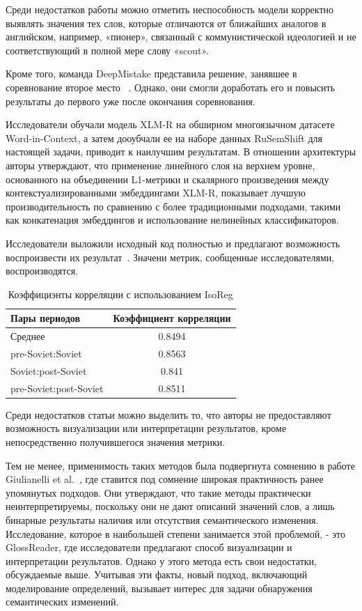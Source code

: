 \documentclass[LI,VKR]{HSEUniversity}
\begin{document}
Среди недостатков работы можно отметить неспособность модели корректно выявлять
значения тех слов, которые отличаются от ближайших аналогов в английском, например,
«пионер», связанный с коммунистической идеологией и не соответствующий в полной мере
слову «scout».

Кроме того, команда DeepMistake представила решение, занявшее в соревнование второе место
~\cite{DeepMistake}.
Однако, они смогли доработать его и повысить результаты до первого уже после окончания
соревнования.

Исследователи обучали модель XLM-R на обширном многоязычном датасете Word-in-Context,
а затем дооубчали ее на наборе данных RuSemShift для настоящей задачи,
приводит к наилучшим результатам.
В отношении архитектуры авторы утверждают, что применение линейного слоя на верхнем уровне,
основанного на объединении L1-метрики и скалярного произведения между контекстуализированными
эмбеддингами XLM-R, показывает лучшую производительность по сравнению с
более традиционными подходами, такими как конкатенация эмбеддингов и
использование нелинейных классификаторов.

Исследователи выложили исходный код полностью и предлагают возможность воспроизвести их
результат~\cite{DeepMistakeGitHub}.
Значени метрик, сообщенные исследователями, воспроизводятся.

\begin{table}[H]
\centering
\caption{Коэффициэнты корреляции с использованием IsoReg}
\begin{tabular}{lc}
\hline
Пары периодов                  & Коэффициент корреляции \\
\hline
Среднее            & 0.8494                  \\
pre-Soviet:Soviet           & 0.8563                  \\
Soviet:post-Soviet          & 0.841                  \\
pre-Soviet:post-Soviet      & 0.8511                  \\
\hline
\end{tabular}
\end{table}

Среди недостатков статьи можно выделить то, что авторы не предоставляют возможность визуализации
или интерпретации результатов, кроме непосредственно получившегося значения метрики.

Тем не менее, применимость таких методов была подвергнута сомнению в работе
Giulianelli et al.~\cite{DefinitionGenerationMainArticle},
где ставится под сомнение широкая практичность ранее упомянутых подходов.
Они утверждают, что такие методы практически неинтерпретируемы,
поскольку они не дают описаний значений слов,
а лишь бинарные результаты наличия или отсутствия семантического изменения.
Исследование, которое в наибольшей степени занимается этой проблемой, - это GlossReader,
где исследователи предлагают способ визуализации и интерпретации результатов.
Однако у этого метода есть свои недостатки, обсуждаемые выше.
Учитывая эти факты, новый подход, включающий моделирование определений,
вызывает интерес для задачи обнаружения семантических изменений.
\end{document}
